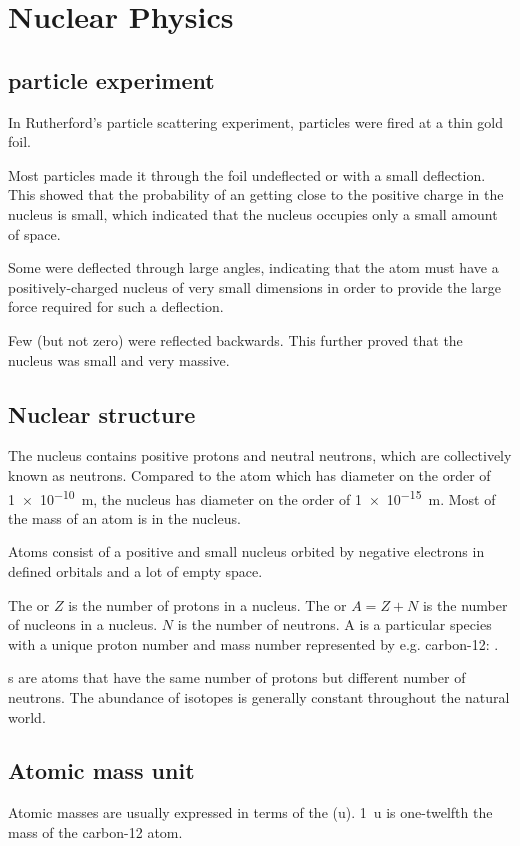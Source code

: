 \documentclass[Physics.tex]{subfiles}
\begin{document}
\chapter{Nuclear Physics}
\section{\upalpha{} particle experiment}
In Rutherford's \upalpha{} particle scattering experiment, \upalpha{} particles were fired at a thin gold foil.

Most \upalpha{} particles made it through the foil undeflected or with a small deflection. This showed that the probability of an \upalpha{} getting close to the positive charge in the nucleus is small, which indicated that the nucleus occupies only a small amount of space.

Some \upalpha{} were deflected through large angles, indicating that the atom must have a positively-charged nucleus of very small dimensions in order to provide the large force required for such a deflection.

Few (but not zero) \upalpha{} were reflected backwards. This further proved that the nucleus was small and very massive.
\section{Nuclear structure}
The nucleus contains positive protons and neutral neutrons, which are collectively known as neutrons. Compared to the atom which has diameter on the order of \SI{1e-10}{\metre}, the nucleus has diameter on the order of \SI{1e-15}{\metre}. Most of the mass of an atom is in the nucleus.

Atoms consist of a positive and small nucleus orbited by negative electrons in defined orbitals and a lot of empty space.

The  or  \(Z\) is the number of protons in a nucleus. The  or  \(A = Z + N\) is the number of nucleons in a nucleus. \(N\) is the number of neutrons. A  is a particular species with a unique proton number and mass number represented by  e.g. carbon-12: .

s are atoms that have the same number of protons but different number of neutrons. The abundance of isotopes is generally constant throughout the natural world.
\section{Atomic mass unit}
Atomic masses are usually expressed in terms of the  (\si{\amu}). \SI{1}{\amu} is one-twelfth the mass of the carbon-12 atom.
\end{document}
